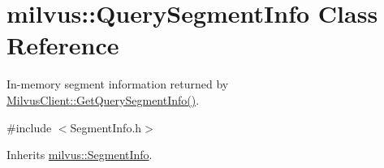 \hypertarget{classmilvus_1_1_query_segment_info}{}\section{milvus\+:\+:Query\+Segment\+Info Class Reference}
\label{classmilvus_1_1_query_segment_info}


In-\/memory segment information returned by \hyperlink{classmilvus_1_1_milvus_client_a7a5a78cb57e5d80adea1f1b0bffe5ba0}{Milvus\+Client\+::\+Get\+Query\+Segment\+Info()}.  




{\ttfamily \#include $<$Segment\+Info.\+h$>$}



Inherits \hyperlink{classmilvus_1_1_segment_info}{milvus\+::\+Segment\+Info}.

